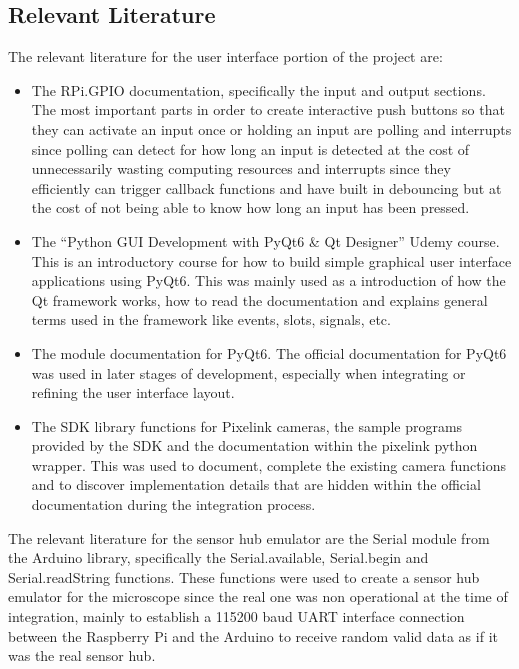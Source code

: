 \subsection{Relevant Literature}
The relevant literature for the user interface portion of the project are:
\begin{itemize}
	\item The RPi.GPIO documentation, specifically the input and output sections.\cite{RaspberrygpiopythonWikiExamples} The most important parts in order to create interactive push buttons so that they can activate an input once or holding an input are polling and interrupts since polling can detect for how long an input is detected at the cost of unnecessarily wasting computing resources and interrupts since they efficiently can trigger callback functions and have built in debouncing but at the cost of not being able to know how long an input has been pressed.
	\item The ``Python GUI Development with PyQt6 \& Qt Designer'' Udemy course.\cite{PythonGUIDevelopmenta} This is an introductory course for how to build simple graphical user interface applications using PyQt6. This was mainly used as a introduction of how the Qt framework works, how to read the documentation and explains general terms used in the framework like events, slots, signals, etc.
	\item The module documentation for PyQt6.\cite{ModulesPyQtDocumentation} The official documentation for PyQt6 was used in later stages of development, especially when integrating or refining the user interface layout.
	\item The SDK library functions for Pixelink cameras, the sample programs provided by the SDK and the documentation within the pixelink python wrapper.\cite{WhatFunctionsFeatures} This was used to document, complete the existing camera functions and to discover implementation details that are hidden within the official documentation during the integration process.
\end{itemize}
The relevant literature for the sensor hub emulator are the Serial module from the Arduino library, specifically the Serial.available, Serial.begin and Serial.readString functions.\cite{SerialAvailableArduino, SerialBeginArduino, SerialReadStringArduino} These functions were used to create a sensor hub emulator for the microscope since the real one was non operational at the time of integration, mainly to establish a 115200 baud UART interface connection between the Raspberry Pi and the Arduino to receive random valid data as if it was the real sensor hub.
